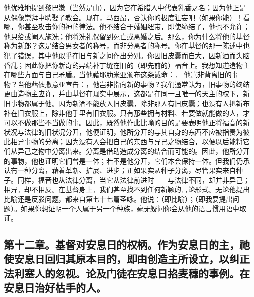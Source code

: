 他优雅地提到黎巴嫩（当然是山），因为它在希腊人中代表乳香之名；因为他正是从偶像崇拜中聘娶了教会。现在，马西昂，否认你的极度狂妄吧（如果你能）！看哪，你甚至攻击你的神的律法。他不结合于婚姻纽带，即使缔结了，他也不允许；他只给或阉人施洗；他将洗礼保留到死亡或离婚之后。那么，你为什么将他的基督称为新郎？这是结合男女者的称号，而非分离者的称号。你在基督的那一陈述中也犯了错误，其中他似乎在旧与新之间作出分别。你因旧皮囊而自大，因新酒而头脑昏乱；因此你把你新奇的异端补丁缝在旧的（即先前的）福音上。我想知道造物主在哪些方面与自己矛盾。当他藉耶肋米亚颁布这条诫命：， 他岂非背离旧的事物？当他藉依撒意亚宣告：，他岂非指向新的事物？我们通常认为，旧事物的终结更由造物主应许，并由基督在现实中展示，这都是在同一且唯一的天主的权下，新旧事物都属于他。因为新酒不能放入旧皮囊，除非那人有旧皮囊；也没有人把新布补在旧衣服上，除非他手里有旧衣服。只有那些拥有材料、若要做就能做的人，才可以不做那些不当做的事。因此，既然他作此比喻的目的是要表明他正将福音的新状况与法律的旧状况分开，他便证明，他所分开的与其自身的东西不应被指责为彼此相异事物的分离；因为没有人会把自己的东西与异己之物结合，以便以后能将它们从异己之物中分离出来。分离是借助造成分离的结合而可能的。因此，他所分开的事物，他也证明它们曾是一体；若不是他分开，它们本会保持一体。但我们仍承认有一种分离，藉着革新、扩展、进步；正如果实从种子分离，尽管果实来自种子。同样，福音也从法律分离，当它从法律前进时——与法律不同，却并非异己；相异，却不相反。在基督身上，我们甚至找不到任何新颖的言论形式。无论他提出比喻还是反驳问题，都来自第七十七篇圣咏。他说：（即比喻）；（即我要提出问题）。如果你想证明一个人属于另一个种族，毫无疑问你会从他的语言惯用语中取证。\par


\subsection{第十二章。基督对安息日的权柄。作为安息日的主，祂使安息日回归其原本目的，即由创造主所设立，以纠正法利塞人的忽视。论及门徒在安息日掐麦穗的事例。在安息日治好枯手的人。}

